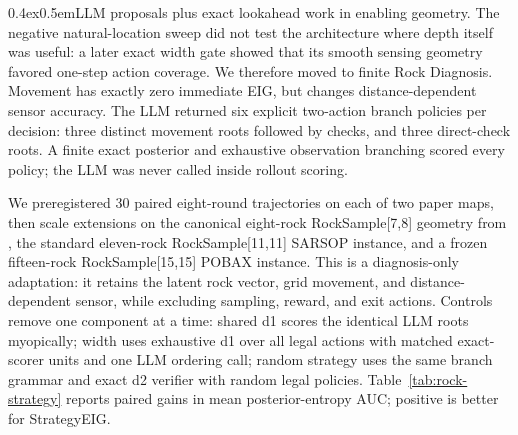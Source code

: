 \documentclass[10pt]{article}
\makeatletter
\renewcommand\paragraph{\@startsection{paragraph}{4}{0pt}%
  {0.4ex}{0.5em}{\normalfont\normalsize\bfseries}}
\makeatother
\begin{document}
\paragraph{LLM proposals plus exact lookahead work in enabling geometry.}
The negative natural-location sweep did not test the architecture where depth
itself was useful: a later exact width gate showed that its smooth sensing geometry
favored one-step action coverage. We therefore moved to finite Rock Diagnosis.
Movement has exactly zero immediate EIG, but changes distance-dependent sensor
accuracy. The LLM returned six explicit two-action branch policies per decision:
three distinct movement roots followed by checks, and three direct-check roots.
A finite exact posterior and exhaustive observation branching scored every policy;
the LLM was never called inside rollout scoring.

We preregistered 30 paired eight-round trajectories on each of two paper maps,
then scale extensions on the canonical eight-rock RockSample[7,8] geometry from
\citet{smith2004hsvi}, the standard eleven-rock RockSample[11,11] SARSOP instance,
and a frozen fifteen-rock RockSample[15,15] POBAX instance.
This is a diagnosis-only
adaptation: it retains the latent rock vector, grid movement, and distance-dependent
sensor, while excluding sampling, reward, and exit actions.
Controls remove one component at a time: shared d1 scores the identical LLM roots
myopically; width uses exhaustive d1 over all legal actions with matched exact-scorer
units and one LLM ordering call; random strategy uses the same branch grammar and
exact d2 verifier with random legal policies. Table~\ref{tab:rock-strategy} reports
paired gains in mean posterior-entropy AUC; positive is better for StrategyEIG.
\end{document}
